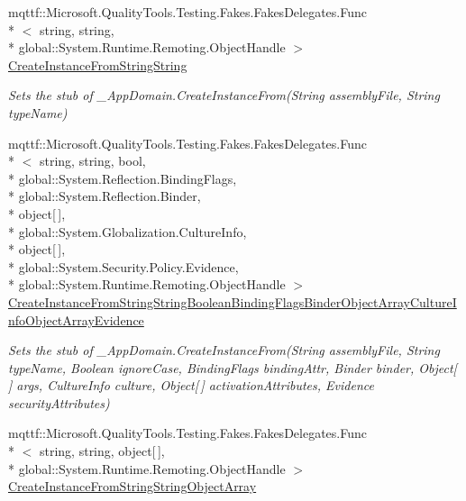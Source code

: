 \begin{DoxyCompactItemize}
mqttf\-::\-Microsoft.\-Quality\-Tools.\-Testing.\-Fakes.\-Fakes\-Delegates.\-Func\\*
$<$ string, string, \\*
global\-::\-System.\-Runtime.\-Remoting.\-Object\-Handle $>$ \hyperlink{class_system_1_1_fakes_1_1_stub___app_domain_a3eaa4bf5c36db0d6f29bb8d6072ef9f9}{Create\-Instance\-From\-String\-String}
\begin{DoxyCompactList}\small\item\em Sets the stub of \-\_\-\-App\-Domain.\-Create\-Instance\-From(\-String assembly\-File, String type\-Name)\end{DoxyCompactList}\item 
mqttf\-::\-Microsoft.\-Quality\-Tools.\-Testing.\-Fakes.\-Fakes\-Delegates.\-Func\\*
$<$ string, string, bool, \\*
global\-::\-System.\-Reflection.\-Binding\-Flags, \\*
global\-::\-System.\-Reflection.\-Binder, \\*
object\mbox{[}$\,$\mbox{]}, \\*
global\-::\-System.\-Globalization.\-Culture\-Info, \\*
object\mbox{[}$\,$\mbox{]}, \\*
global\-::\-System.\-Security.\-Policy.\-Evidence, \\*
global\-::\-System.\-Runtime.\-Remoting.\-Object\-Handle $>$ \hyperlink{class_system_1_1_fakes_1_1_stub___app_domain_ae6807c99cb243901cd410998bdb9aaf7}{Create\-Instance\-From\-String\-String\-Boolean\-Binding\-Flags\-Binder\-Object\-Array\-Culture\-Info\-Object\-Array\-Evidence}
\begin{DoxyCompactList}\small\item\em Sets the stub of \-\_\-\-App\-Domain.\-Create\-Instance\-From(\-String assembly\-File, String type\-Name, Boolean ignore\-Case, Binding\-Flags binding\-Attr, Binder binder, Object\mbox{[}$\,$\mbox{]} args, Culture\-Info culture, Object\mbox{[}$\,$\mbox{]} activation\-Attributes, Evidence security\-Attributes)\end{DoxyCompactList}\item 
mqttf\-::\-Microsoft.\-Quality\-Tools.\-Testing.\-Fakes.\-Fakes\-Delegates.\-Func\\*
$<$ string, string, object\mbox{[}$\,$\mbox{]}, \\*
global\-::\-System.\-Runtime.\-Remoting.\-Object\-Handle $>$ \hyperlink{class_system_1_1_fakes_1_1_stub___app_domain_a69b79ca5168f5e9f2e75506c1332db0e}{Create\-Instance\-From\-String\-String\-Object\-Array}

\end{DoxyCompactItemize}
